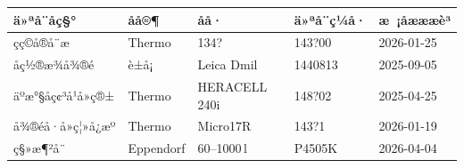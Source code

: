 \documentclass[UTF8,10pt,a4paper,fontset=fandol]{ctexart}
\newcommand{\fieldvalue}[1]{#1}
\newcommand{\handwritten}[1]{#1}
\begin{document}
\small
\begin{tabularx}{\textwidth}{|X|X|X|X|X|}
\hline
ä»ªå¨åç§° & åå®¶ & åå· & ä»ªå¨ç¼å· & æ ¡åæææè³ \\ \hline
çç©å®å¨æ &
\fieldvalue{Thermo} &
\fieldvalue{\handwritten{134?}} &
\fieldvalue{\handwritten{143?00}} &
\fieldvalue{\handwritten{2026-01-25}} \\ \hline
åç½®æ¾å¾®é &
\fieldvalue{è±å¡} &
\fieldvalue{Leica Dmil} &
\fieldvalue{\handwritten{1440813}} &
\fieldvalue{\handwritten{2025-09-05}} \\ \hline
äºæ°§åç¢³å¹å»ç®± &
\fieldvalue{Thermo} &
\fieldvalue{HERACELL 240i} &
\fieldvalue{\handwritten{148?02}} &
\fieldvalue{\handwritten{2025-04-25}} \\ \hline
å¾®éå·å»ç¦»å¿æº &
\fieldvalue{Thermo} &
\fieldvalue{Micro17R} &
\fieldvalue{\handwritten{143?1}} &
\fieldvalue{\handwritten{2026-01-19}} \\ \hline
ç§»æ¶²å¨ &
\fieldvalue{Eppendorf} &
\fieldvalue{\handwritten{60--1000\,\textmu l}} &
\fieldvalue{\handwritten{P4505K}} &
\fieldvalue{\handwritten{2026-04-04}} \\ \hline
\end{tabularx}
\normalsize
\end{document}
